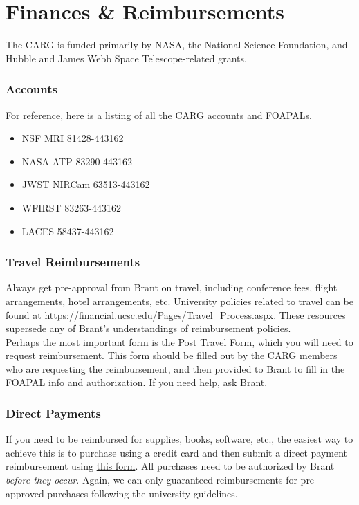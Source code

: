 \section{Finances \& Reimbursements}
\label{sec:finances}

The CARG is funded primarily by
NASA,
the National Science Foundation,
and Hubble and James Webb Space
Telescope-related grants. 

\subsubsection{Accounts}
For reference, here is a listing of all the CARG accounts and FOAPALs.
\begin{itemize}
\item NSF MRI 81428-443162
\item NASA ATP 83290-443162
\item JWST NIRCam 63513-443162
\item WFIRST 83263-443162
\item LACES 58437-443162
\end{itemize}

\subsubsection{Travel Reimbursements}

Always get pre-approval from 
Brant on travel,
including conference fees,
flight arrangements, 
hotel arrangements, etc. 
University policies related to
travel can be found at \href{https://financial.ucsc.edu/Pages/Travel_Process.aspx}{https://financial.ucsc.edu/Pages/Travel\_Process.aspx}. These resources
supersede any of Brant's 
understandings of reimbursement
policies.\\

\noindent
Perhaps the most important form is the 
\href{https://financial.ucsc.edu/Financial_Affairs_Forms/Post_Travel_Expense.pdf}{Post Travel Form}, which
you will need to request reimbursement.
This form should be filled out by
the CARG members who are 
requesting the reimbursement, and
then provided to Brant to fill in
the FOAPAL info and authorization.
If you need help, ask Brant.

\subsubsection{Direct Payments}
\label{sec:direct_payments}

If you need to be reimbursed for supplies, books, software, etc., the easiest way to achieve this is to purchase using a credit card and then submit a direct payment reimbursement using \href{https://financial.ucsc.edu/Pages/WF_Direct_Payment.aspx}{this form}. All purchases need to be authorized by Brant \emph{before they occur}. Again, we can only guaranteed reimbursements for pre-approved purchases following the university guidelines.

